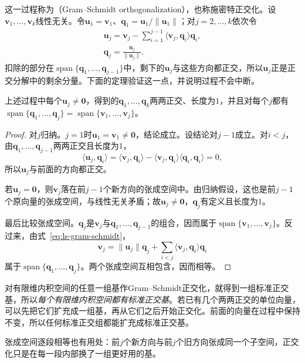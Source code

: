 这一过程称为（Gram--Schmidt orthogonalization），也称施密特正交化。设$\bm v_1,\ldots,\bm v_k$线性无关。令$\bm u_1=\bm v_1$、$\bm q_1=\bm u_1/\lVert\bm u_1\rVert$；对$j=2,\ldots,k$依次令
\begin{equation}
\begin{gathered}
\bm u_j=\bm v_j-\sum_{i=1}^{j-1}\langle\bm v_j,\bm q_i\rangle\bm q_i,\\
\bm q_j=\frac{\bm u_j}{\lVert\bm u_j\rVert}.
\end{gathered}
\label{eq:ls-gram-schmidt}
\end{equation}
扣除的部分在$\operatorname{span}\{\bm q_1,\ldots,\bm q_{j-1}\}$中，剩下的$\bm u_j$与这些方向都正交，所以$\bm u_j$正是正交分解中的剩余分量。下面的定理验证这一点，并说明过程不会中断。
\begin{theorem}
\label{thm:ls-gram-schmidt}
上述过程中每个$\bm u_j\neq\bm0$，得到的$\bm q_1,\ldots,\bm q_k$两两正交、长度为$1$，并且对每个$j$都有$\operatorname{span}\{\bm q_1,\ldots,\bm q_j\}=\operatorname{span}\{\bm v_1,\ldots,\bm v_j\}$。
\end{theorem}
\begin{proof}
对$j$归纳。$j=1$时$\bm u_1=\bm v_1\neq\bm0$，结论成立。设结论对$j-1$成立。对$i<j$，由$\bm q_1,\ldots,\bm q_{j-1}$两两正交且长度为$1$，
\[
 \langle\bm u_j,\bm q_i\rangle=\langle\bm v_j,\bm q_i\rangle-\langle\bm v_j,\bm q_i\rangle\langle\bm q_i,\bm q_i\rangle=0,
\]
所以$\bm u_j$与前面的方向都正交。

若$\bm u_j=\bm0$，则$\bm v_j$落在前$j-1$个新方向的张成空间中。由归纳假设，这也是前$j-1$个原向量的张成空间，与线性无关矛盾；故$\bm u_j\neq\bm0$，$\bm q_j$有定义且长度为$1$。

最后比较张成空间。$\bm q_j$是$\bm v_j$与$\bm q_1,\ldots,\bm q_{j-1}$的组合，因而属于$\operatorname{span}\{\bm v_1,\ldots,\bm v_j\}$。反过来，由式~\eqref{eq:ls-gram-schmidt}，
\[
 \bm v_j=\lVert\bm u_j\rVert\bm q_j+\sum_{i<j}\langle\bm v_j,\bm q_i\rangle\bm q_i
\]
属于$\operatorname{span}\{\bm q_1,\ldots,\bm q_j\}$。两个张成空间互相包含，因而相等。
\end{proof}
对有限维内积空间的任意一组基作Gram--Schmidt正交化，就得到一组标准正交基，所以\emph{每个有限维内积空间都有标准正交基}。若已有几个两两正交的单位向量，可以先把它们扩充成一组基，再从它们之后开始正交化。前面的向量在过程中保持不变，所以任何标准正交组都能扩充成标准正交基。

张成空间逐段相等也有用处：前$j$个新方向与前$j$个旧方向张成同一个子空间，正交化只是在每一段内部换了一组更好用的基。

